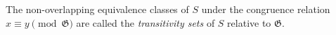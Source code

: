 The non-overlapping equivalence classes of $S$ under the congruence relation $x \equiv y \pmod{\mathfrak{G}}$ are called the \textit{transitivity sets} of $S$ relative to $\mathfrak{G}$.
